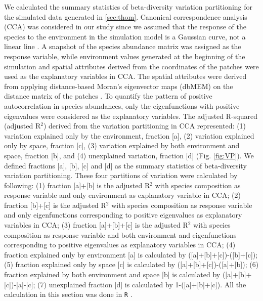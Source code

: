 We calculated the summary statistics of beta-diversity variation partitioning for the simulated data generated in \autoref{sec:thom}. Canonical correspondence analysis (CCA) was considered in our study since we assumed that the response of the species to the environment in the simulation model is a Gaussian curve, not a linear line \citep{ter1986canonical, legendre2012numerical}. A snapshot of the species abundance matrix was assigned as the response variable, while environment values generated at the beginning of the simulation and spatial attributes derived from the coordinates of the patches were used as the explanatory variables in CCA. The spatial attributes were derived from applying distance-based Moran's eigenvector maps (dbMEM) on the distance matrix of the patches \citep{borcard2002all}. To quantify the pattern of positive autocorrelation in species abundances, only the eigenfunctions with positive eigenvalues were considered as the explanatory variables. The adjusted R-squared (adjusted R$^2$) \citep[pp.~633]{legendre2012numerical} derived from the variation partitioning in CCA represented: (1) variation explained only by the environment, fraction [a], (2) variation explained only by space, fraction [c], (3) variation explained by both environment and space, fraction [b], and (4) unexplained variation, fraction [d] (Fig. \ref{fig:VP}). We defined fractions [a], [b], [c] and [d] as the summary statistics of beta-diversity variation partitioning. These four partitions of variation were calculated by following: (1) fraction [a]+[b] is the adjusted R$^2$ with species composition as response variable and only environment as explanatory variable in CCA; (2) fraction [b]+[c] is the adjusted R$^2$ with species composition as response variable and only eigenfunctions corresponding to positive eigenvalues as explanatory variables in CCA; (3) fraction [a]+[b]+[c] is the adjusted R$^2$ with species composition as response variable and both environment and eigenfunctions corresponding to positive eigenvalues as explanatory variables in CCA; (4) fraction explained only by environment [a] is calculated by ([a]+[b]+[c])-([b]+[c]); (5) fraction explained only by space [c] is calculated by ([a]+[b]+[c])-([a]+[b]); (6) fraction explained by both environment and space [b] is calculated by ([a]+[b]+[c])-[a]-[c]; (7) unexplained fraction [d] is calculated by 1-([a]+[b]+[c]). All the calculation in this section was done in \texttt{R} \citep{R}.

